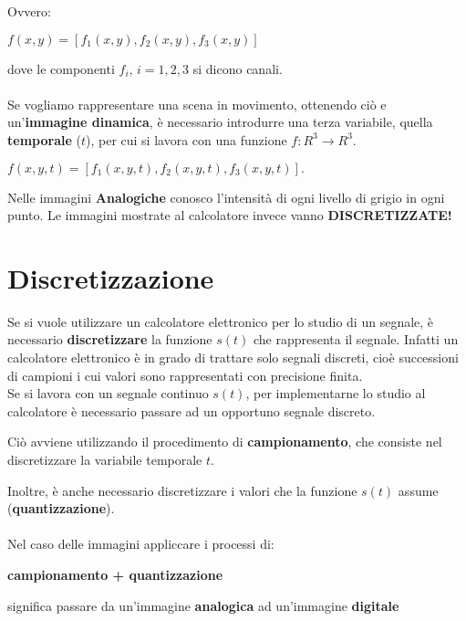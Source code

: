 Ovvero:
\begin{center}
    $f(x,y) = [f_1(x,y), f_2(x,y), f_3(x,y)]$
\end{center}
dove le componenti $f_i$, $i = 1,2,3$ si dicono canali. \\\\Se vogliamo
rappresentare una scena in movimento, ottenendo ciò e un’\textbf{immagine
    dinamica}, è necessario introdurre una terza variabile, quella
\textbf{temporale} ($t$), per cui si lavora con una funzione $f: R^3 \rightarrow
    R^3$.
\begin{center}
    $f(x,y,t) = [f_1(x,y,t), f_2(x ,y,t), f_3(x,y,t)].$
\end{center}
Nelle immagini \textbf{Analogiche} conosco l'intensità di ogni livello di grigio
in ogni punto. Le immagini mostrate al calcolatore invece vanno
\textbf{DISCRETIZZATE!}
\section{Discretizzazione}
Se si vuole utilizzare un calcolatore elettronico per lo studio di un segnale, è
necessario \textbf{discretizzare} la funzione $s(t)$ che rappresenta il segnale.
Infatti un calcolatore elettronico è in grado di trattare solo segnali discreti,
cioè successioni di campioni i cui valori sono rappresentati con precisione
finita. \\Se si lavora con un segnale continuo $s(t)$, per implementarne lo
studio al calcolatore è necessario passare ad un opportuno segnale discreto.
\begin{center}
    Ciò avviene utilizzando il procedimento di \textbf{campionamento}, che
    consiste nel discretizzare la variabile temporale $t$.
\end{center}
Inoltre, è anche necessario discretizzare i valori che la funzione $s(t)$ assume
(\textbf{quantizzazione}). \\\\Nel caso delle immagini appliccare i processi di:
\begin{center}
    \textbf{campionamento + quantizzazione}
\end{center}
significa passare da un'immagine \textbf{analogica} ad un'immagine
\textbf{digitale}
